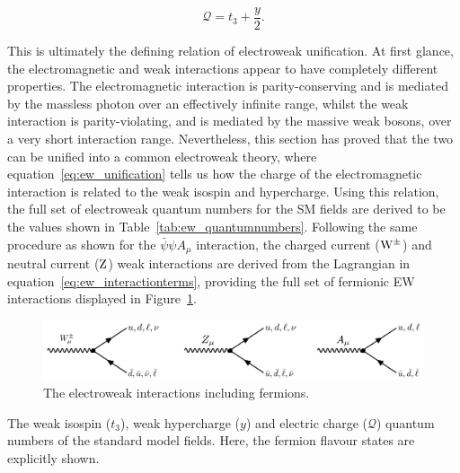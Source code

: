 \begin{equation}\label{eq:ew_unification}
    \mathcal{Q} = t_3 + \frac{y}{2}.
\end{equation}

\noindent
This is ultimately the defining relation of electroweak unification. At first glance, the electromagnetic and weak interactions appear to have completely different properties. The electromagnetic interaction is parity-conserving and is mediated by the massless photon over an effectively infinite range, whilst the weak interaction is parity-violating, and is mediated by the massive weak bosons, over a very short interaction range. Nevertheless, this section has proved that the two can be unified into a common electroweak theory, where equation~\ref{eq:ew_unification} tells us how the charge of the electromagnetic interaction is related to the weak isospin and hypercharge. Using this relation, the full set of electroweak quantum numbers for the SM fields are derived to be the values shown in Table~\ref{tab:ew_quantumnumbers}. Following the same procedure as shown for the $\bar{\psi}\psi A_\mu$ interaction, the charged current (${\rm{W}}^{\pm}$) and neutral current (${\rm{Z}}$) weak interactions are derived from the Lagrangian in equation~\ref{eq:ew_interactionterms}, providing the full set of fermionic EW interactions displayed in Figure~\ref{fig:feynman_ew}.

\begin{figure}[htb!]
  \centering
  \includegraphics[width=.9\linewidth]{Figures/theory/ew_interaction.pdf}
  \caption[The electroweak interaction including fermions]
  {
    The electroweak interactions including fermions.
  }
  \label{fig:feynman_ew}
\end{figure}

\begin{table}[htb!]
    \caption[The electroweak quantum numbers of the SM fields]{The weak isospin ($t_3$), weak hypercharge ($y$) and electric charge ($\mathcal{Q}$) quantum numbers of the standard model fields. Here, the fermion flavour states are explicitly shown.}
    \label{tab:ew_quantumnumbers}
    \centering
    \renewcommand{\arraystretch}{1.2}
    \setlength{\tabcolsep}{20pt}
    
\end{table}

